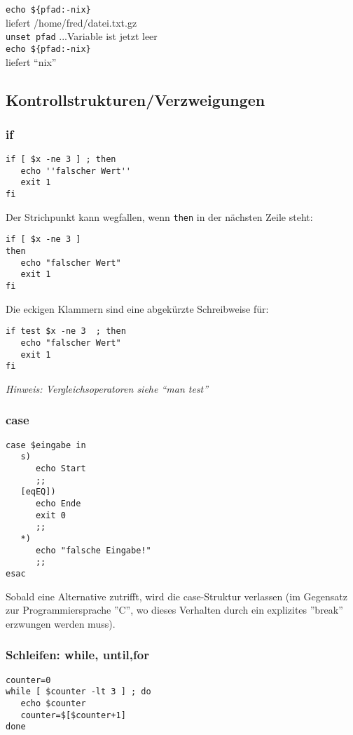 \documentclass[11pt]{article}
\begin{document}
\texttt{echo \$\{pfad:-nix\}}\\
liefert /home/fred/datei.txt.gz\\
\texttt{unset pfad} ...Variable ist jetzt leer\\
\texttt{echo \$\{pfad:-nix\}}\\
liefert ``nix''


\subsection{Kontrollstrukturen/Verzweigungen}
\subsubsection{if}
\begin{verbatim}
if [ $x -ne 3 ] ; then
   echo ''falscher Wert''
   exit 1
fi
\end{verbatim}

Der Strichpunkt kann wegfallen, wenn \texttt{then} in der nächsten Zeile steht:
\begin{verbatim}
if [ $x -ne 3 ] 
then
   echo "falscher Wert"
   exit 1
fi
\end{verbatim}

Die eckigen Klammern sind eine abgekürzte Schreibweise für:

\begin{verbatim}
if test $x -ne 3  ; then
   echo "falscher Wert"
   exit 1
fi
\end{verbatim}

\textit{Hinweis: Vergleichsoperatoren siehe ``man test''}

\subsubsection{case}
\begin{verbatim}
case $eingabe in
   s)
      echo Start
      ;;
   [eqEQ])
      echo Ende
      exit 0
      ;;
   *)
      echo "falsche Eingabe!"
      ;;
esac
\end{verbatim}
Sobald eine Alternative zutrifft, wird die case-Struktur verlassen (im
Gegensatz zur Programmiersprache ''C'', wo dieses Verhalten durch ein
explizites ''break'' erzwungen werden muss).


\subsubsection{Schleifen: while, until,for}
\begin{verbatim}
counter=0
while [ $counter -lt 3 ] ; do
   echo $counter
   counter=$[$counter+1]
done
\end{verbatim}
\end{document}
